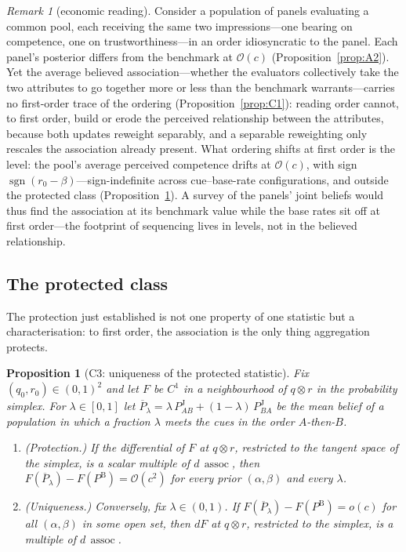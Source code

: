 \documentclass[review,12pt,authoryear]{elsarticle}
\newtheorem{proposition}{Proposition}
\theoremstyle{remark}
\newtheorem{remark}{Remark}
\theoremstyle{definition}
\newcommand{\PB}{P^{\mathrm{B}}}
\newcommand{\PJ}{P^{\mathrm{J}}}
\newcommand{\Pbar}{\overline{P}}
\newcommand{\assoc}{\operatorname{assoc}}
\newcommand{\sgn}{\operatorname{sgn}}
\newcommand{\bigO}{\mathcal{O}}
\newcommand{\anchor}[1]{}
\begin{document}
\begin{remark}[economic reading]\label{rem:economic}
Consider a population of panels evaluating a common pool, each receiving the same two
impressions---one bearing on competence, one on trustworthiness---in an order idiosyncratic to
the panel. Each panel's posterior differs from the benchmark at $\bigO(c)$
(Proposition~\ref{prop:A2}). Yet the average believed association---whether the evaluators
collectively take the two attributes to go together more or less than the benchmark
warrants---carries no first-order trace of the ordering (Proposition~\ref{prop:C1}): reading
order cannot, to first order, build or erode the perceived relationship between the attributes,
because both updates reweight separably, and a separable reweighting only rescales the
association already present. What ordering shifts at first order is the level: the pool's
average perceived competence drifts at $\bigO(c)$, with sign $\sgn(r_0-\beta)$---sign-indefinite
across cue--base-rate configurations, and outside the protected class
(Proposition~\ref{prop:C3}). A survey of the panels' joint beliefs would thus find the
association at its benchmark value while the base rates sit off at first order---the footprint
of sequencing lives in levels, not in the believed relationship.
\end{remark}

\subsection{The protected class}
\label{sec:protected}

The protection just established is not one property of one statistic but a
characterisation: to first order, the association is the only thing aggregation protects.

\begin{proposition}[C3: uniqueness of the protected statistic]\label{prop:C3}
Fix $(q_0,r_0)\in(0,1)^2$ and let $F$ be $C^1$ in a neighbourhood of $q\otimes r$ in the
probability simplex. For $\lambda\in[0,1]$ let
$\Pbar_\lambda=\lambda\,\PJ_{AB}+(1-\lambda)\,\PJ_{BA}$ be the mean belief of a population in
which a fraction $\lambda$ meets the cues in the order $A$-then-$B$.
\begin{enumerate}
\item[(i)] \textup{(Protection.)} If the differential of $F$ at $q\otimes r$, restricted to the
tangent space of the simplex, is a scalar multiple of $d\,\assoc$, then
$F(\Pbar_\lambda)-F(\PB)=\bigO(c^2)$ for every prior $(\alpha,\beta)$ and every $\lambda$.
\item[(ii)] \textup{(Uniqueness.)} Conversely, fix $\lambda\in(0,1)$. If
$F(\Pbar_\lambda)-F(\PB)=o(c)$ for all $(\alpha,\beta)$ in some open set, then $dF$ at
$q\otimes r$, restricted to the simplex, is a multiple of $d\,\assoc$.
\end{enumerate}
\anchor{Prop.~C3}
\end{proposition}
\end{document}
